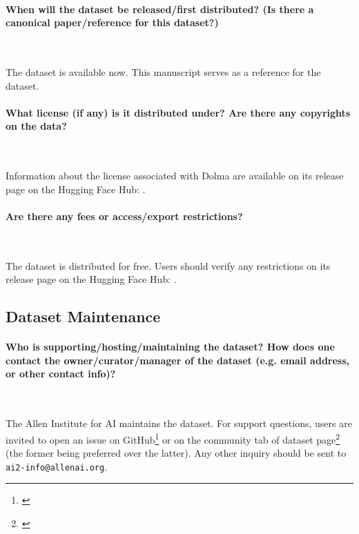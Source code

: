 \documentclass{article}
\newcommand{\dolma}{Dolma\xspace}
\begin{document}
\paragraph{When will the dataset be released/first distributed? (Is there a canonical paper/reference for this dataset?)}~

The dataset is available now. 
This manuscript serves as a reference for the dataset.

\paragraph{What license (if any) is it distributed under? Are there any copyrights on the data?}~

Information about the license associated with \dolma are available on its release page on the Hugging Face Hub: \href{https://huggingface.co/datasets/allenai/dolma}{}.

\paragraph{Are there any fees or access/export restrictions?}~

The dataset is distributed for free. 
Users should verify any restrictions on its release page on the Hugging Face Hub: \href{https://huggingface.co/datasets/allenai/dolma}{}.

\subsection{Dataset Maintenance}

\paragraph{Who is supporting/hosting/maintaining the dataset? How does one contact the owner/curator/manager of the dataset (e.g. email address, or other contact info)?}~

The Allen Institute for AI maintains the dataset. 
For support questions, users are invited to open an issue on GitHub\footnote{\href{https://github.com/allenai/dolma/issues}{}} or on the community tab of dataset page\footnote{\href{https://huggingface.co/datasets/allenai/dolma/discussions}{}} (the former being preferred over the latter).
Any other inquiry should be sent to \texttt{ai2-info@allenai.org}.
\end{document}
